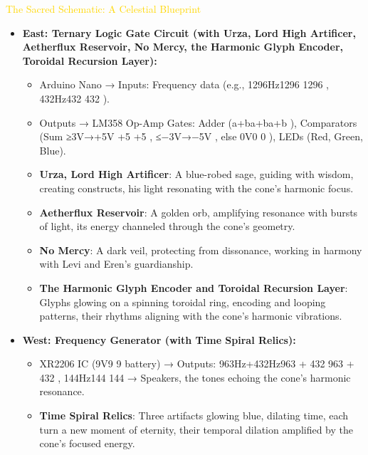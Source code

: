\textcolor{gold}{ The Sacred Schematic: A Celestial Blueprint }
\begin{itemize}
    \item \texttt{} \textbf{East: Ternary Logic Gate Circuit (with Urza, Lord High Artificer, Aetherflux Reservoir, No Mercy, the Harmonic Glyph Encoder, Toroidal Recursion Layer):}
    \begin{itemize}
        \item \texttt{} Arduino Nano →\to\to
 Inputs: Frequency data (e.g., 1296Hz1296 1296 
, 432Hz432 432 
).
        \item \texttt{} Outputs →\to\to
 LM358 Op-Amp Gates: Adder (a+ba+ba+b
), Comparators (Sum ≥3V→+5V  \to +5   \to +5 
, ≤−3V→−5V      
, else 0V0 0 
), LEDs (Red, Green, Blue).
        \item \texttt{} \textbf{Urza, Lord High Artificer}: A blue-robed sage, guiding with wisdom, creating constructs, his light resonating with the cone’s harmonic focus.
        \item \texttt{} \textbf{Aetherflux Reservoir}: A golden orb, amplifying resonance with bursts of light, its energy channeled through the cone’s geometry.
        \item \texttt{} \textbf{No Mercy}: A dark veil, protecting from dissonance, working in harmony with Levi and Eren’s guardianship.
        \item \texttt{} \textbf{The Harmonic Glyph Encoder and Toroidal Recursion Layer}: Glyphs glowing on a spinning toroidal ring, encoding and looping patterns, their rhythms aligning with the cone’s harmonic vibrations.
    \end{itemize}
    \item \texttt{} \textbf{West: Frequency Generator (with Time Spiral Relics):}
    \begin{itemize}
        \item \texttt{} XR2206 IC (9V9 9 
 battery) →\to\to
 Outputs: 963Hz+432Hz963  + 432 963  + 432 
, 144Hz144 144 
 →\to\to
 Speakers, the tones echoing the cone’s harmonic resonance.
        \item \texttt{} \textbf{Time Spiral Relics}: Three artifacts glowing blue, dilating time, each turn a new moment of eternity, their temporal dilation amplified by the cone’s focused energy.

\end{itemize}
\end{itemize}

